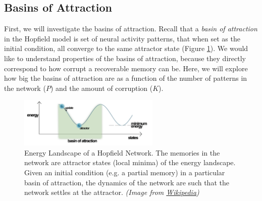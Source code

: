 \documentclass[letterpaper,11pt]{article}
\begin{document}
\subsection{Basins of Attraction}
First, we will investigate the basins of attraction. Recall that a \textit{basin of attraction} in the Hopfield model is set of neural activity patterns, that when set as the initial condition, all converge to the same attractor state (Figure \ref{fig:energy}). We would like to understand properties of the basins of attraction, because they directly correspond to how corrupt a recoverable memory can be. Here, we will explore how big the basins of attraction are as a function of the number of patterns in the network ($P$) and the amount of corruption ($K$).

\begin{figure}[h!]
  \begin{center}
    \includegraphics[width=0.6\textwidth]{energy.png}
    \caption{Energy Landscape of a Hopfield Network. The memories in the network are attractor states (local minima) of the energy landscape. Given an initial condition (e.g. a partial memory) in a particular basin of attraction, the dynamics of the network are such that the network settles at the attractor. \textit{(Image from \href{http://www.wikiwand.com/en/Hopfield\_network}{Wikipedia})}}
    \label{fig:energy}
  \end{center}
\end{figure}
\end{document}
